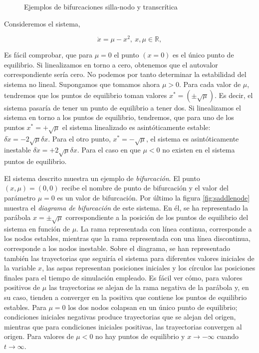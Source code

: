 \begin{example}
\begin{figure}
\caption{Ejemplos de bifurcaciones silla-nodo y transcrítica}
\end{figure}
Consideremos el sistema,

\begin{equation*}
\dot x = \mu - x^2,\  x, \mu \in \mathbb{R},  
\end{equation*}

Es fácil comprobar, que para $\mu =0$ el punto $(x = 0)$ es el único punto de equilibrio. Si linealizamos en torno a cero, obtenemos que el autovalor correspondiente sería cero.  No podemos por tanto determinar la estabilidad del sistema no lineal. Supongamos que tomamos ahora $\mu > 0$. Para cada valor de $\mu$, tendremos que los puntos de equilibrio toman valores $x^* = ( \pm \sqrt{\mu})$. Es decir, el sistema pasaría de tener un punto de equilibrio a tener dos. Si linealizamos el sistema en torno a los puntos de equilibrio, tendremos, que para uno de los puntos $x^*=+\sqrt{\mu}$ el sistema linealizado es asintóticamente estable: $ \delta\dot{x} = -2\sqrt{\mu}\delta x$. Para el otro punto, $x^*=-\sqrt{\mu}$, el sistema es asintóticamente inestable $ \delta \dot{x} = +2\sqrt{\mu}\delta x$.
Para el caso en 	que $\mu<0$ no existen en el sistema puntos de equilibrio.

El sistema descrito muestra un ejemplo de \emph{bifurcación}. El punto $(x,\mu)=(0,0)$ recibe el nombre de punto de bifurcación y el valor del parámetro $\mu = 0$ es un valor de bifurcación. Por último la figura \ref{fig:saddlenode} muestra el \emph{diagrama de bifurcación} de este sistema. En él, se ha representado la parábola $x=\pm \sqrt{\mu}$ correspondiente a la posición de los puntos de equilibrio del sistema en función de $\mu$. La rama representada con línea continua, corresponde a los nodos estables, mientras que la rama representada con una línea discontinua, corresponde a los nodos inestable. Sobre el diagrama, se han representado también las trayectorias que seguiría el sistema para diferentes valores iniciales de la variable $x$, las  aspas representan posiciones iniciales y los círculos las posiciones finales para el tiempo de simulación empleado. Es fácil ver cómo, para valores positivos de $\mu$  las trayectorias se alejan de la rama negativa de la parábola y, en su caso, tienden a converger en la positiva que contiene los puntos de equilibrio estables. Para $\mu =0$ los dos nodos colapsan en un único punto de equilibrio; condiciones iniciales negativas produce trayectorias que se alejan del origen, mientras que para condiciones iniciales positivas, las trayectorias convergen al origen. Para valores de $\mu<0$ no hay puntos de equilibrio y $x\to -\infty$ cuando $t\to \infty$.


\end{example}
